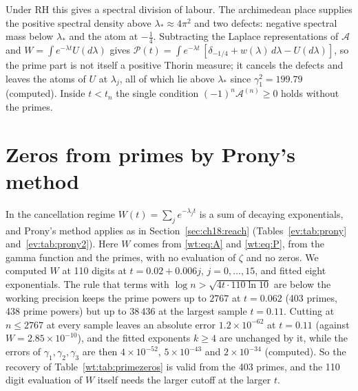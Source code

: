Under RH this gives a spectral division of labour. The archimedean place supplies the positive spectral density above $\lambda_*\approx4\pi^2$ and two defects: negative spectral mass below $\lambda_*$ and the atom at $-\frac14$. Subtracting the Laplace representations of $\mathcal A$ and $W=\int e^{-\lambda t}U(d\lambda)$ gives $\mathcal P(t)=\int e^{-\lambda t}\,[\delta_{-1/4}+w(\lambda)\,d\lambda-U(d\lambda)]$, so the prime part is not itself a positive Thorin measure; it cancels the defects and leaves the atoms of $U$ at $\lambda_j$, all of which lie above $\lambda_*$ since $\gamma_1^2=199.79$ (computed). Inside $t<t_n$ the single condition $(-1)^n\mathcal A^{(n)}\ge0$ holds without the primes.

\section{Zeros from primes by Prony's method}\label{wt:sec:prony}

In the cancellation regime $W(t)=\sum_je^{-\lambda_jt}$ is a sum of decaying exponentials, and Prony's method applies as in Section~\ref{sec:ch18:reach} (Tables~\ref{ev:tab:prony} and~\ref{ev:tab:prony2}). Here $W$ comes from \eqref{wt:eq:A} and \eqref{wt:eq:P}, from the gamma function and the primes, with no evaluation of $\zeta$ and no zeros. We computed $W$ at 110 digits at $t=0.02+0.006j$, $j=0,\dots,15$, and fitted eight exponentials. The rule that terms with $\log n>\sqrt{4t\cdot110\ln10}$ are below the working precision keeps the prime powers up to $2767$ at $t=0.062$ (403 primes, 438 prime powers) but up to $38\,436$ at the largest sample $t=0.11$. Cutting at $n\le2767$ at every sample leaves an absolute error $1.2\times10^{-62}$ at $t=0.11$ (against $W=2.85\times10^{-10}$), and the fitted exponents $k\ge4$ are unchanged by it, while the errors of $\gamma_1,\gamma_2,\gamma_3$ are then $4\times10^{-52}$, $5\times10^{-43}$ and $2\times10^{-34}$ (computed). So the recovery of Table~\ref{wt:tab:primezeros} is valid from the 403 primes, and the 110 digit evaluation of $W$ itself needs the larger cutoff at the larger $t$.

